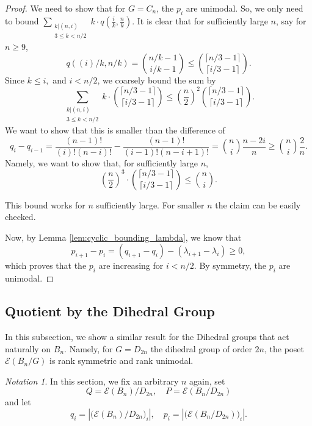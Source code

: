 \documentclass[10 pt]{amsart}
\theoremstyle{plain}
\theoremstyle{definition}
\theoremstyle{remark}
\newtheorem{note}[thm]{Notation}
\numberwithin{equation}{section}
\newcommand\ssec{\subsection}
\newcommand{\dstyle}{\displaystyle}
\begin{document}
\begin{proof}
We need to show that for $G= C_n$, the $p_i$ are unimodal. So, we only need to bound $ \dstyle \sum_{\substack{k | (n , i)\\ 3 \le k < n/2 }} k \cdot q (\frac{i}{k}, \frac{n}{k}) $. It is clear that for sufficiently large $n$, say for $n \ge 9$, $$q((i)/k, n/k) = {n/k - 1 \choose i/k -1} \le {\lceil n/3-1 \rceil \choose \lceil i/3 -1 \rceil }.$$ Since $k \leq i,$ and $ i < n/2$, we coarsely bound the sum by $$\sum_{\substack{k | (n , i)\\ 3 \le k < n/2 }} k  \cdot {\lceil n/3-1 \rceil \choose \lceil i/3 -1 \rceil } \le (\frac{n}{2})^2  {\lceil n/3-1 \rceil \choose \lceil i/3 -1 \rceil }. $$ We want to show that this is smaller than the difference of $$q_i - q_{i-1} = \frac{(n-1)!}{(i)! (n-i)!} - \frac{(n-1)!}{(i-1)!(n-i+1)!}= {n \choose i } \frac{n-2i}{n} \ge  {n \choose i } \frac{2}{n} .$$
Namely, we want to show that, for sufficiently large $n$, 
$$ \left(\frac{n}{2}\right)^3 \cdot {\lceil n/3-1 \rceil \choose \lceil i/3 -1 \rceil }  \le   {n \choose i}.$$

This bound works for $n$ sufficiently large. For smaller $n$ the claim can be easily checked. 

Now, by Lemma \ref{lem:cyclic_bounding_lambda}, we know that $$p_{i+1} - p_{i} =  (q_{i+1} - q_i) - (\lambda_{i+1}- \lambda_i) \ge 0,$$  which proves that the $p_i$ are increasing for $i < n/2$. By symmetry, the $p_i$ are unimodal.
\end{proof}






\ssec{Quotient by the Dihedral Group}
\label{ssec:dihedral}

In this subsection, we show a similar result for the Dihedral groups that act naturally on $B_n$. Namely, for $G = D_{2n}$ the dihedral group of order $2n$, the poset $\mathcal E(B_n/G)$ is rank symmetric and rank unimodal.


\begin{note} In this section, we fix an arbitrary $n$ again, set $$Q = \mathcal E (B_n)/D_{2n}, \quad P = \mathcal E(B_n/D_{2n})$$ and let $$q_i = |\big( \mathcal E (B_n)/D_{2n} \big)_i|, \quad p_i = |\big( \mathcal E(B_n/D_{2n}) \big)_i|. $$ 
\end{note}

\building*
\end{document}
